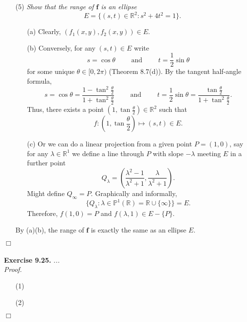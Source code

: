 \documentclass{article}
\begin{document}
\begin{enumerate}
\item[(5)]
  \emph{Show that the range of $\mathbf{f}$ is an ellipse}
  \[
    E = \{ (s,t) \in \mathbb{R}^2 : s^2 + 4t^2 = 1 \}.
  \]
  \begin{enumerate}
  \item[(a)]
    Clearly, $(f_1(x,y), f_2(x,y)) \in E$.

  \item[(b)]
    Conversely, for any $(s,t) \in E$ write
    \[
      s = \cos\theta
      \qquad \text{ and } \qquad
      t = \frac{1}{2} \sin\theta
    \]
    for some unique $\theta \in [0,2\pi)$ (Theorem 8.7(d)).
    By the tangent half-angle formula,
    \[
      s = \cos\theta = \frac{1-\tan^2\frac{\theta}{2}}{1+\tan^2\frac{\theta}{2}}
      \qquad \text{ and } \qquad
      t = \frac{1}{2} \sin\theta = \frac{\tan\frac{\theta}{2}}{1+\tan^2\frac{\theta}{2}}.
    \]
    Thus, there exists a point
    $\left(1, \tan\frac{\theta}{2}\right) \in \mathbb{R}^2$ such that
    \[
      f: \left(1, \tan\frac{\theta}{2}\right)
      \mapsto (s, t) \in E.
    \]

  \item[(c)]
    Or we can do a linear projection from a given point $P = (1,0)$,
    say for any $\lambda \in \mathbb{R}^1$ we define a line through $P$
    with slope $-\lambda$ meeting $E$ in a further point
    \[
      Q_{\lambda}
      = \left(\frac{\lambda^2-1}{\lambda^2+1},
        \frac{\lambda}{\lambda^2+1}\right).
    \]
    Might define $Q_{\infty} = P$.
    Graphically and informally,
    \[
      \{ Q_{\lambda} : \lambda \in \mathbb{P}^1(\mathbb{R}) = \mathbb{R} \cup \{\infty\} \} = E.
    \]
    Therefore, $f(1,0) = P$ and $f(\lambda, 1) \in E-\{P\}$.

  \end{enumerate}
  By (a)(b), the range of $\mathbf{f}$ is exactly the same as an ellipse $E$.

\end{enumerate}
$\Box$ \\\\






\textbf{Exercise 9.25.}
\emph{...} \\

\emph{Proof.}
\begin{enumerate}
\item[(1)]
\item[(2)]

\end{enumerate}
$\Box$ \\\\
\end{document}
